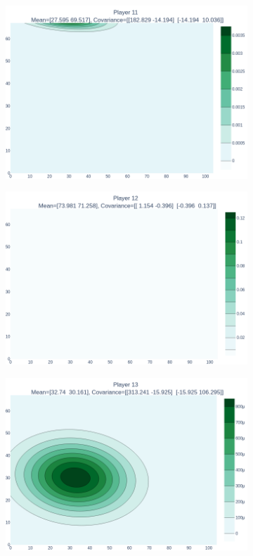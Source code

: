 \documentclass[14pt,a4]{article}
\begin{document}
\begin{figure}[h]
\begin{subfigure}{0.3\linewidth}
        \includegraphics[scale=0.1]{images/q6/partb/11.png}
    \end{subfigure}
    \hfill
    \begin{subfigure}{0.3\linewidth}
        \centering
        \includegraphics[scale=0.1]{images/q6/partb/12.png}
    \end{subfigure}
    \hfill
    \begin{subfigure}{0.3\linewidth}
        \centering
        \includegraphics[scale=0.1]{images/q6/partb/13.png}

\end{subfigure}
\end{figure}
\end{document}
